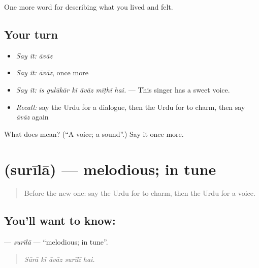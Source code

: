 \begin{grammarlens}[title={What you've built}]
One more word for describing what you lived and felt.
\end{grammarlens}

\subsection*{Your turn}
\begin{itemize}
\raggedright
  \item \emph{Say it:} \emph{āvāz}
  \item \emph{Say it:} \emph{āvāz}, once more
  \item \emph{Say it:} \emph{is gulūkār kī āvāz mīṭhī hai.} — This singer has a sweet voice.
  \item \emph{Recall:} say the Urdu for a dialogue, then the Urdu for to charm, then say \emph{āvāz} again
\end{itemize}

\begin{tcolorbox}[breakable,colback=teal!4,colframe=teal!35!black,title={Before you move on}]
What does  mean? (\textquotedblleft{}A voice; a sound\textquotedblright{}.) Say it once more.
\end{tcolorbox}
\section[\texorpdfstring{\ur{سریلا} (surīlā)}{سریلا (surīlā)}]{ (surīlā) — melodious; in tune}

\label{lesson:UR-C518-surila}



\begin{quote}
Before the new one: say the Urdu for to charm, then the Urdu for a voice.
\end{quote}

\subsection*{You'll want to know: }
\textbf{} — \emph{surīlā} — \textquotedblleft{}melodious; in tune\textquotedblright{}.

\begin{quote}
    
\end{quote}

\begin{quote}
\emph{Sārā kī āvāz surīlī hai.}
\end{quote}

